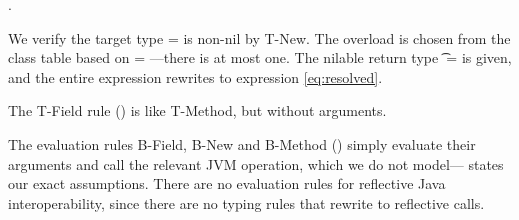 {\methodexp {\getparent{}} {\newstaticexp {\String} {\File{}} {\File{}} {}} {}}.

We verify the target type \s{} = \File is non-nil by T-New.
The overload is chosen from the class table based on  = \File---there is at most one.
The nilable return type \t{} = \Union{\Nil}{\String} is given, and the 
entire expression rewrites to expression \ref{eq:resolved}.
%

The T-Field rule () is like T-Method, but without arguments.

The evaluation rules B-Field, B-New and B-Method () simply evaluate their
arguments and call the relevant JVM operation, which we do not model---
states our exact assumptions.
There are no evaluation rules for reflective Java interoperability, since there are no typing
rules that rewrite to reflective calls.


